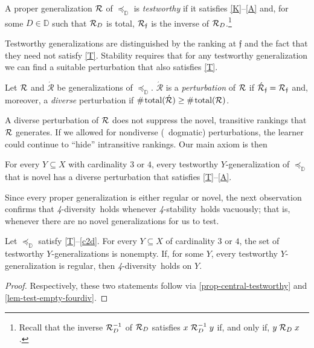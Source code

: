 \documentclass[12pt,a4paper,twoside]{article}
\newcommand{\novel}{\mathfrak f}
\newcommand{\preceqb}{\mathbin{\preceq}}
\newcommand{\countof}{\mathbin{\#}\hskip1pt}
\newcommand{\ext}{\mathrel{\mc R}}
\newcommand{\extb}{\mathbin{\mc R}}
\newcommand{\hextb}{\mathbin{\hat{\mathbin{\mathcal R}}}}
\newcommand{\aext}{\mathrel{\acute{\mathrel{\mathcal R}}}}
\newcommand{\aextb}{\mathbin{\acute{\mathbin{\mathcal R}}}}
\newcommand{\total}{\textup{total}}
\newcommand{\mbbd}{{\mathds D}}
\newcommand{\stability}{\textit{4}-\textup{{stability}}}
\newcommand{\fourdiv}{\textit{4}-\textup{diversity}}
\begin{document}
\begin{definition*}\label{def-testworthy}

  A proper {generalization} $\ext$ of $\preceqb_{\mbbd}$ is \emph{testworthy}
  if it satisfies \textup{\ref{K}--\ref{A}} and, for some $D\in \mbbd$ such
  that $\ext_{D}$ is total, $\extb _{\novel}$ is the inverse of
  $\extb_{D}$.\footnote{Recall that the inverse $\ext _{D}^{- 1}$ of $\ext
  _{D}$ satisfies $x \ext _{D}^{- 1} y$ if, and only if, $y \ext _{D}
  x$.}
\end{definition*}
Testworthy {generalization}s are distinguished by the ranking at $\novel$ and
the fact that they need not satisfy \ref{T}.  Stability requires that for any
testworthy {generalization} we can find a suitable perturbation that also
satisfies \ref{T}.
\begin{definition*} Let $\ext$ and $\aext$ be {generalization}s of
  $\preceqb_{\mbbd}$. $\aext$ is a \emph{perturbation} of $\ext$ if
  $\aextb_{\novel} = \extb_{\novel}$ and, moreover, a \emph{{{diverse}}}
  perturbation if $\countof \total (\aextb) \geq \countof \total ( \extb)$.
\end{definition*}
A diverse perturbation of $\ext$ does not suppress the novel, transitive
rankings that $\ext$ generates. If we allowed for nondiverse (\ie\ dogmatic)
perturbations, the learner could continue to ``hide'' intransitive rankings.
Our main axiom is then
\begin{stability*}\label{P}
  For every $Y\subseteq X$ with cardinality $3$ or $4$, every testworthy
  $Y$-{generalization} of $\preceqb _{\mbbd}$ that is novel has a {{diverse}}
  perturbation that satisfies \ref{T}–\ref{A}.
\end{stability*}
Since every proper {generalization} is either regular or novel, the next
observation confirms that \fourdiv\ holds whenever \stability\ holds vacuously;
that is, whenever there are no novel {generalization}s for us to test.
\begin{observation} \label{obs-testworthy}
  Let $\preceq_{\mbbd}$ satisfy \ref{T}–\ref{c2d}. For
  every $Y\subseteq X$ of cardinality $3$ or $4$, the set of testworthy
  $Y$-{generalization}s is nonempty. If, for some $Y$, every testworthy
  $Y$-{generalization} is regular, then \fourdiv\ holds on $Y$.
\end{observation}
\begin{proof}\label{proof-obs-testworthy}
  Respectively, these two statements follow via \cref{prop-central-testworthy}
  and \cref{lem-test-empty-fourdiv}.
\end{proof}
\end{document}
